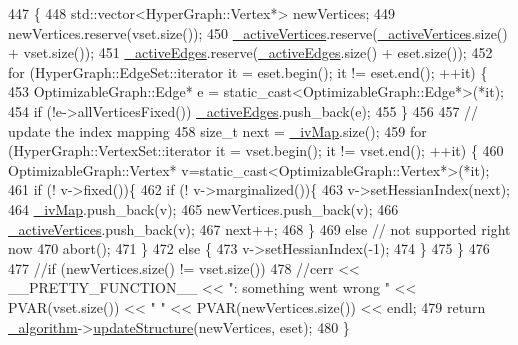 \begin{DoxyCode}
447   \{
448     std::vector<HyperGraph::Vertex*> newVertices;
449     newVertices.reserve(vset.size());
450     \hyperlink{classg2o_1_1SparseOptimizer_a805e1db97802980fa4dfef95cfa5e63e}{\_activeVertices}.reserve(\hyperlink{classg2o_1_1SparseOptimizer_a805e1db97802980fa4dfef95cfa5e63e}{\_activeVertices}.size() + vset.size());
451     \hyperlink{classg2o_1_1SparseOptimizer_a3207df163943bc1672fc7872964a6d6c}{\_activeEdges}.reserve(\hyperlink{classg2o_1_1SparseOptimizer_a3207df163943bc1672fc7872964a6d6c}{\_activeEdges}.size() + eset.size());
452     \textcolor{keywordflow}{for} (HyperGraph::EdgeSet::iterator it = eset.begin(); it != eset.end(); ++it) \{
453       OptimizableGraph::Edge* e = \textcolor{keyword}{static\_cast<}OptimizableGraph::Edge*\textcolor{keyword}{>}(*it);
454       \textcolor{keywordflow}{if} (!e->allVerticesFixed()) \hyperlink{classg2o_1_1SparseOptimizer_a3207df163943bc1672fc7872964a6d6c}{\_activeEdges}.push\_back(e);
455     \}
456     
457     \textcolor{comment}{// update the index mapping}
458     \textcolor{keywordtype}{size\_t} next = \hyperlink{classg2o_1_1SparseOptimizer_a488b95a90a61454c787e9c13458e510b}{\_ivMap}.size();
459     \textcolor{keywordflow}{for} (HyperGraph::VertexSet::iterator it = vset.begin(); it != vset.end(); ++it) \{
460       OptimizableGraph::Vertex* v=\textcolor{keyword}{static\_cast<}OptimizableGraph::Vertex*\textcolor{keyword}{>}(*it);
461       \textcolor{keywordflow}{if} (! v->fixed())\{
462         \textcolor{keywordflow}{if} (! v->marginalized())\{
463           v->setHessianIndex(next);
464           \hyperlink{classg2o_1_1SparseOptimizer_a488b95a90a61454c787e9c13458e510b}{\_ivMap}.push\_back(v);
465           newVertices.push\_back(v);
466           \hyperlink{classg2o_1_1SparseOptimizer_a805e1db97802980fa4dfef95cfa5e63e}{\_activeVertices}.push\_back(v);
467           next++;
468         \} 
469         \textcolor{keywordflow}{else} \textcolor{comment}{// not supported right now}
470           abort();
471       \}
472       \textcolor{keywordflow}{else} \{
473         v->setHessianIndex(-1);
474       \}
475     \}
476 
477     \textcolor{comment}{//if (newVertices.size() != vset.size())}
478     \textcolor{comment}{//cerr << \_\_PRETTY\_FUNCTION\_\_ << ": something went wrong " << PVAR(vset.size()) << " " <<
       PVAR(newVertices.size()) << endl;}
479     \textcolor{keywordflow}{return} \hyperlink{classg2o_1_1SparseOptimizer_a665d4ba54db76a1174bfc85a6dbc5127}{\_algorithm}->\hyperlink{classg2o_1_1OptimizationAlgorithm_a6b86c5d3c56a41c18f2aee611b62d71b}{updateStructure}(newVertices, eset);
480   \}
\end{DoxyCode}
